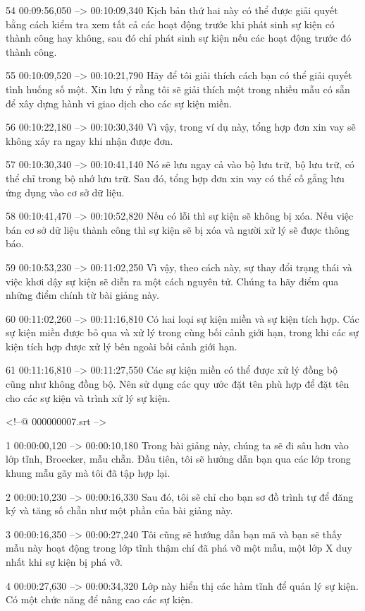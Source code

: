 54
00:09:56,050 --> 00:10:09,340
Kịch bản thứ hai này có thể được giải quyết bằng cách kiểm tra xem tất cả các hoạt động trước khi phát sinh sự kiện có thành công hay không, sau đó chỉ phát sinh sự kiện nếu các hoạt động trước đó thành công.

55
00:10:09,520 --> 00:10:21,790
Hãy để tôi giải thích cách bạn có thể giải quyết tình huống số một.  Xin lưu ý rằng tôi sẽ giải thích một trong nhiều mẫu có sẵn để xây dựng hành vi giao dịch cho các sự kiện miền.

56
00:10:22,180 --> 00:10:30,340
Vì vậy, trong ví dụ này, tổng hợp đơn xin vay sẽ không xảy ra ngay khi nhận được đơn.

57
00:10:30,340 --> 00:10:41,140
Nó sẽ lưu ngay cả vào bộ lưu trữ, bộ lưu trữ, có thể chỉ trong bộ nhớ lưu trữ.  Sau đó, tổng hợp đơn xin vay có thể cố gắng lưu ứng dụng vào cơ sở dữ liệu.

58
00:10:41,470 --> 00:10:52,820
Nếu có lỗi thì sự kiện sẽ không bị xóa.  Nếu việc bán cơ sở dữ liệu thành công thì sự kiện sẽ bị xóa và người xử lý sẽ được thông báo.

59
00:10:53,230 --> 00:11:02,250
Vì vậy, theo cách này, sự thay đổi trạng thái và việc khơi dậy sự kiện sẽ diễn ra một cách nguyên tử.  Chúng ta hãy điểm qua những điểm chính từ bài giảng này.

60
00:11:02,260 --> 00:11:16,810
Có hai loại sự kiện miền và sự kiện tích hợp.  Các sự kiện miền được bỏ qua và xử lý trong cùng bối cảnh giới hạn, trong khi các sự kiện tích hợp được xử lý bên ngoài bối cảnh giới hạn.

61
00:11:16,810 --> 00:11:27,550
Các sự kiện miền có thể được xử lý đồng bộ cũng như không đồng bộ.  Nên sử dụng các quy ước đặt tên phù hợp để đặt tên cho các sự kiện và trình xử lý sự kiện.

<!--@ 000000007.srt -->

1
00:00:00,120 --> 00:00:10,180
Trong bài giảng này, chúng ta sẽ đi sâu hơn vào lớp tĩnh, Broecker, mẫu chẵn.  Đầu tiên, tôi sẽ hướng dẫn bạn qua các lớp trong khung mẫu gãy mà tôi đã tập hợp lại.

2
00:00:10,230 --> 00:00:16,330
Sau đó, tôi sẽ chỉ cho bạn sơ đồ trình tự để đăng ký và tăng số chẵn như một phần của bài giảng này.

3
00:00:16,350 --> 00:00:27,240
Tôi cũng sẽ hướng dẫn bạn mã và bạn sẽ thấy mẫu này hoạt động trong lớp tĩnh thậm chí đã phá vỡ một mẫu, một lớp X duy nhất khi sự kiện bị phá vỡ.

4
00:00:27,630 --> 00:00:34,320
Lớp này hiển thị các hàm tĩnh để quản lý sự kiện.  Có một chức năng để nâng cao các sự kiện.

